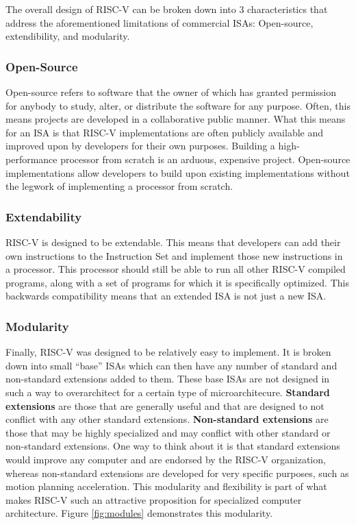 
    The overall design of RISC-V can be broken down into 3 characteristics that address the aforementioned limitations of commercial \glspl{ISA}: Open-source, extendibility, and modularity.

    \subsubsection{Open-Source}
        Open-source refers to software that the owner of which has granted permission for anybody to study, alter, or distribute the software for any purpose. Often, this means projects are developed in a collaborative public manner. What this means for an ISA is that RISC-V implementations are often publicly available and improved upon by developers for their own purposes. Building a high-performance processor from scratch is an arduous, expensive project. Open-source implementations allow developers to build upon existing implementations without the legwork of implementing a processor from scratch.

    \subsubsection{Extendability}
        RISC-V is designed to be extendable. This means that developers can add their own instructions to the Instruction Set and implement those new instructions in a processor. This processor should still be able to run all other RISC-V compiled programs, along with a set of programs for which it is specifically optimized. This backwards compatibility means that an extended ISA is not just a new ISA. 

    \subsubsection{Modularity}
        Finally, RISC-V was designed to be relatively easy to implement. It is broken down into small ``base'' \glspl{ISA} which can then have any number of standard and non-standard extensions added to them. These base ISAs are not designed in such a way to overarchitect for a certain type of microarchitecure. \textbf{Standard extensions} are those that are generally useful and that are designed to not conflict with any other standard extensions. \textbf{Non-standard extensions} are those that may be highly specialized and may conflict with other standard or non-standard extensions. One way to think about it is that standard extensions would improve any computer and are endorsed by the RISC-V organization, whereas non-standard extensions are developed for very specific purposes, such as motion planning acceleration. This modularity and flexibility is part of what makes RISC-V such an attractive proposition for specialized computer architecture. Figure \ref{fig:modules} demonstrates this modularity.

